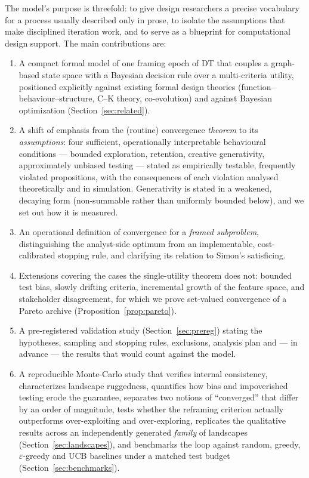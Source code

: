 \documentclass[11pt]{article}
\begin{document}
\noindent The model's purpose is threefold: to give design researchers a precise vocabulary for a process usually described only in prose, to isolate the assumptions that make disciplined iteration work, and to serve as a blueprint for computational design support. The main contributions are:
\begin{enumerate}
    \item A compact formal model of one framing epoch of DT that couples a graph-based state space with a Bayesian decision rule over a multi-criteria utility, positioned explicitly against existing formal design theories (function--behaviour--structure, C--K theory, co-evolution) and against Bayesian optimization (Section~\ref{sec:related}).
    \item A shift of emphasis from the (routine) convergence \emph{theorem} to its \emph{assumptions}: four sufficient, operationally interpretable behavioural conditions --- bounded exploration, retention, creative generativity, approximately unbiased testing --- stated as empirically testable, frequently violated propositions, with the consequences of each violation analysed theoretically and in simulation. Generativity is stated in a weakened, decaying form (non-summable rather than uniformly bounded below), and we set out how it is measured.
    \item An operational definition of convergence for a \emph{framed subproblem}, distinguishing the analyst-side optimum from an implementable, cost-calibrated stopping rule, and clarifying its relation to Simon's satisficing.
    \item Extensions covering the cases the single-utility theorem does not: bounded test bias, slowly drifting criteria, incremental growth of the feature space, and stakeholder disagreement, for which we prove set-valued convergence of a Pareto archive (Proposition~\ref{prop:pareto}).
    \item A pre-registered validation study (Section~\ref{sec:prereg}) stating the hypotheses, sampling and stopping rules, exclusions, analysis plan and --- in advance --- the results that would count against the model.
    \item A reproducible Monte-Carlo study that verifies internal consistency, characterizes landscape ruggedness, quantifies how bias and impoverished testing erode the guarantee, separates two notions of ``converged'' that differ by an order of magnitude, tests whether the reframing criterion actually outperforms over-exploiting and over-exploring, replicates the qualitative results across an independently generated \emph{family} of landscapes (Section~\ref{sec:landscapes}), and benchmarks the loop against random, greedy, $\varepsilon$-greedy and UCB baselines under a matched test budget (Section~\ref{sec:benchmarks}).
\end{enumerate}
\end{document}
